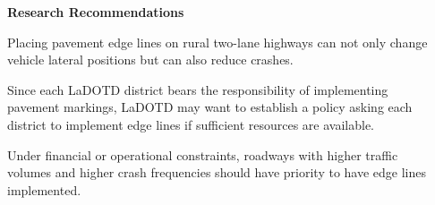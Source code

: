 \documentclass[final]{beamer}
\newlength{\onecolwid}
\newlength{\twocolwid}
\begin{document}
\begin{frame}[t]
\begin{columns}[t]
\begin{column}{\twocolwid}
\begin{columns}[t,totalwidth=\twocolwid]
\begin{column}{\onecolwid}
\begin{block}{\textbf{Research Recommendations}}
    \begin{itemize}
          {\item Placing pavement edge lines on rural two-lane highways can not only change vehicle lateral positions but can also reduce crashes.
          \item Since each LaDOTD district bears the responsibility of implementing pavement markings, LaDOTD may want to establish a policy asking each district to implement edge lines if sufficient resources are available.
          \item Under financial or operational constraints, roadways with higher traffic volumes and higher crash frequencies should have priority to have edge lines implemented.}
    \end{itemize}
    \end{block}





      \end{column}

      \begin{column}{\onecolwid}


\end{column}
\end{columns}
\end{column}
\end{columns}
\end{frame}
\end{document}
